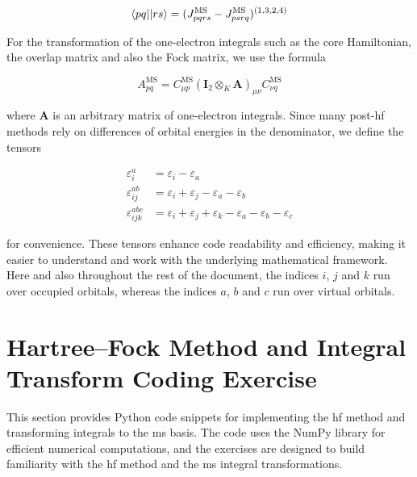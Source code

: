 \begin{equation}
\braket{pq||rs}=(J_{pqrs}^{\mathrm{MS}}-J_{psrq}^{\mathrm{MS}})^{(1,3,2,4)}
\end{equation}

For the transformation of the one-electron integrals such as the core Hamiltonian, the overlap matrix and also the Fock matrix, we use the formula

\begin{equation}
A_{pq}^{\mathrm{MS}}=C_{\mu p}^{\mathrm{MS}}(\mathbf{I}_{2}\otimes_K\mathbf{A})_{\mu\nu}C_{\nu q}^{\mathrm{MS}}
\end{equation}

where \(\mathbf{A}\) is an arbitrary matrix of one-electron integrals. Since many \acrshort{post-hf} methods rely on differences of orbital energies in the denominator, we define the tensors

\begin{align}
\varepsilon^{a}_{i}&=\varepsilon_i-\varepsilon_a \\
\varepsilon^{ab}_{ij}&=\varepsilon_i+\varepsilon_j-\varepsilon_a-\varepsilon_b \\
\varepsilon^{abc}_{ijk}&=\varepsilon_i+\varepsilon_j+\varepsilon_k-\varepsilon_a-\varepsilon_b-\varepsilon_c
\end{align}

for convenience. These tensors enhance code readability and efficiency, making it easier to understand and work with the underlying mathematical framework. Here and also throughout the rest of the document, the indices \(i\), \(j\) and \(k\) run over occupied orbitals, whereas the indices \(a\), \(b\) and \(c\) run over virtual orbitals.

\section{\texorpdfstring{Hartree--Fock Method and Integral Transform Coding Exercise\label{sec:hf_int_code_exercise}}{Hartree--Fock Method and Integral Transform Coding Exercise}}

This section provides Python code snippets for implementing the \acrshort{hf} method and transforming integrals to the \acrshort{ms} basis. The code uses the NumPy library for efficient numerical computations, and the exercises are designed to build familiarity with the \acrshort{hf} method and the \acrshort{ms} integral transformations.

